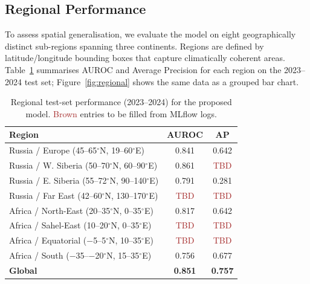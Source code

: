 \documentclass{article}
\begin{document}
\subsection{Regional Performance}
\label{sec:regional}

To assess spatial generalisation, we evaluate the model on eight geographically distinct sub-regions spanning three continents. Regions are defined by latitude/longitude bounding boxes that capture climatically coherent areas. Table~\ref{tab:regional} summarises AUROC and Average Precision for each region on the 2023--2024 test set; Figure~\ref{fig:regional} shows the same data as a grouped bar chart.

\begin{table}[t]
    \centering
    \captionsetup{justification=centering}
    \setlength{\tabcolsep}{4pt}
    \begin{tabular}{lcc}
        \toprule
        \textbf{Region} & \textbf{AUROC} & \textbf{AP} \\
        \midrule
        Russia / Europe       (45--65$^\circ$N, 19--60$^\circ$E) & 0.841 & 0.642 \\
        Russia / W. Siberia   (50--70$^\circ$N, 60--90$^\circ$E) & 0.861 & \textcolor{brown}{TBD} \\
        Russia / E. Siberia   (55--72$^\circ$N, 90--140$^\circ$E) & 0.791 & 0.281 \\
        Russia / Far East     (42--60$^\circ$N, 130--170$^\circ$E) & \textcolor{brown}{TBD} & \textcolor{brown}{TBD} \\
        Africa / North-East   (20--35$^\circ$N, 0--35$^\circ$E) & 0.817 & 0.642 \\
        Africa / Sahel-East   (10--20$^\circ$N, 0--35$^\circ$E) & \textcolor{brown}{TBD} & \textcolor{brown}{TBD} \\
        Africa / Equatorial   ($-$5--5$^\circ$N, 10--35$^\circ$E) & \textcolor{brown}{TBD} & \textcolor{brown}{TBD} \\
        Africa / South        ($-$35--$-$20$^\circ$N, 15--35$^\circ$E) & 0.756 & 0.677 \\
        \midrule
        \textbf{Global}       & \textbf{0.851} & \textbf{0.757} \\
        \bottomrule
    \end{tabular}
    \caption{Regional test-set performance (2023--2024) for the proposed model. \textcolor{brown}{Brown} entries to be filled from MLflow logs.}
    \label{tab:regional}
\end{table}
\end{document}

